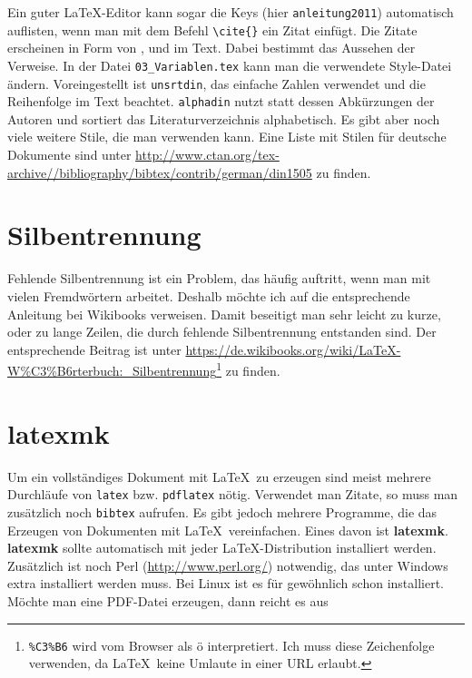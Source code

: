 Ein guter \LaTeX-Editor kann sogar die Keys (hier \verb+anleitung2011+) automatisch auflisten, wenn man mit dem Befehl \verb+\cite{}+ ein Zitat einfügt. Die Zitate erscheinen in Form von \cite{heil2012}, \cite{anleitung2012} und \cite{anleitung2013} im Text. Dabei bestimmt \verb++ das Aussehen der Verweise. In der Datei \verb+03_Variablen.tex+ kann man die verwendete Style-Datei ändern. Voreingestellt ist \verb+unsrtdin+, das einfache Zahlen verwendet und die Reihenfolge im Text beachtet. \verb+alphadin+ nutzt statt dessen Abkürzungen der Autoren und sortiert das Literaturverzeichnis alphabetisch. Es gibt aber noch viele weitere Stile, die man verwenden kann. Eine Liste mit Stilen für deutsche Dokumente sind unter \url{http://www.ctan.org/tex-archive//bibliography/bibtex/contrib/german/din1505} zu finden.

\section{Silbentrennung}

Fehlende Silbentrennung ist ein Problem, das häufig auftritt, wenn man mit vielen Fremdwörtern arbeitet. Deshalb möchte ich auf die entsprechende Anleitung bei Wikibooks verweisen. Damit beseitigt man sehr leicht zu kurze, oder zu lange Zeilen, die durch fehlende Silbentrennung entstanden sind. Der entsprechende Beitrag ist unter \url{https://de.wikibooks.org/wiki/LaTeX-W\%C3\%B6rterbuch:_Silbentrennung}\footnote{\texttt{\%C3\%B6} wird vom Browser als ö interpretiert. Ich muss diese Zeichenfolge verwenden, da \LaTeX\ keine Umlaute in einer URL erlaubt.} zu finden.

\section{latexmk}

Um ein vollständiges Dokument mit \LaTeX\ zu erzeugen sind meist mehrere Durchläufe von \verb+latex+ bzw. \verb+pdflatex+ nötig. Verwendet man Zitate, so muss man zusätzlich noch \verb+bibtex+ aufrufen. Es gibt jedoch mehrere Programme, die das Erzeugen von Dokumenten mit \LaTeX\ vereinfachen. Eines davon ist \textbf{latexmk}. \textbf{latexmk} sollte automatisch mit jeder \LaTeX-Distribution installiert werden. Zusätzlich ist noch Perl (\url{http://www.perl.org/}) notwendig, das unter Windows extra installiert werden muss. Bei Linux ist es für gewöhnlich schon installiert.\\
Möchte man eine PDF-Datei erzeugen, dann reicht es aus

